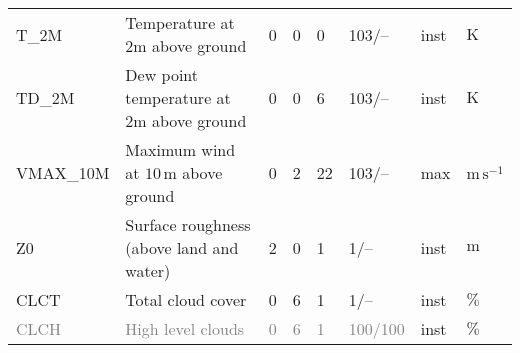 \begin{longtable}{p{2.0cm}p{5.0cm}p{0.7cm}p{0.7cm}p{0.7cm}p{1.4cm}p{1cm}p{1cm}}
T\_2M                          &  Temperature at 2m above ground                                                        &               0                                   &                     0                       &                     0                      &               103/--                            &                      inst                   &        $\mathrm{K}$          \\
TD\_2M                         &  Dew point temperature at 2m above ground                                              &               0                                   &                     0                       &                     6                      &               103/--                            &                      inst                   &        $\mathrm{K}$          \\
VMAX\_10M                      &  Maximum wind at $10\,\mathrm{m}$ above ground                                         &               0                                   &                     2                       &                    22                      &               103/--                            &                      max                    &        $\mathrm{m\,s^{-1}}$   \\
Z0                             &  Surface roughness (above land and water)                                              &               2                                   &                     0                       &                     1                      &                 1/--                            &                      inst                   &        $\mathrm{m}$          \\
CLCT                           &  Total cloud cover                                                                     &               0                                   &                     6                       &                     1                      &                 1/--                            &                      inst                   &        $\mathrm{\%}$          \\
\textcolor{gray}{CLCH}         &  \textcolor{gray}{High level clouds}\footnotemark[3]                                   &               \textcolor{gray}{0}                 &                     \textcolor{gray}{6}     &                    \textcolor{gray}{1}     &                 \textcolor{gray}{100/100}       &                      inst                   &        $\mathrm{\%}$          \\

\end{longtable}
